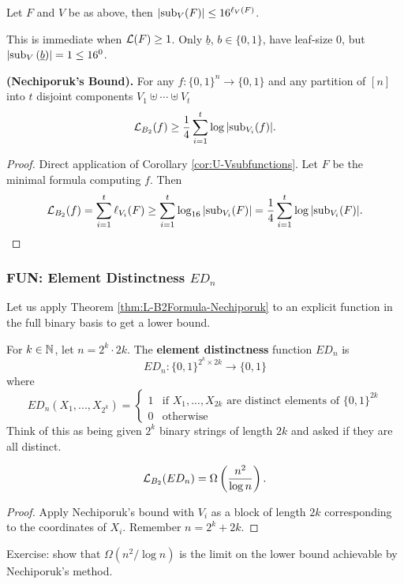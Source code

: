 \documentclass[11pt]{article}
\begin{document}
	\begin{corollary}
		\label{cor:U-Vsubfunctions}
		Let $F$ and $V$ be as above, then $|\mathrm{sub}_V(F)| \leq 16^{\ell_V(F)}$.
	\end{corollary}
	This is immediate when $\mathcal{L}(F) \geq 1$. Only $\underline{b}$, $b \in \{0,1\}$, have leaf-size $0$, but $\left|\mathrm{sub}_V\left(\underline{b}\right)\right| = 1 \leq 16^{0}$. 
	
	\begin{theorem}
		\label{thm:L-B2Formula-Nechiporuk}
		\textbf{(Nechiporuk's Bound).} For any $f: \{0,1\}^n \rightarrow \{0,1\}$ and any partition of $[n]$ into $t$ disjoint components $V_1 \uplus \cdots \uplus V_t$
		\[\mathcal{L}_{B_2}(f) \geq \frac{1}{4}\sum_{i = 1}^{t}\log|\mathrm{sub}_{V_i}(f)|.\]
	\end{theorem}
	\begin{proof}
		Direct application of Corollary \ref{cor:U-Vsubfunctions}. Let $F$ be the minimal formula computing $f$. Then
		\[\mathcal{L}_{B_2}(f) = \sum_{i = 1}^{t}\ell_{V_i}(F) \geq \sum_{i = 1}^{t}\log_{16}|\mathrm{sub}_{V_i}(F)| = \frac{1}{4} \sum_{i = 1}^{t}\log|\mathrm{sub}_{V_i}(F)|.\]
	\end{proof}
	
	\subsubsection{FUN: Element Distinctness \texorpdfstring{$ED_n$}{EDn}}
	Let us apply Theorem \ref{thm:L-B2Formula-Nechiporuk} to an explicit function in the full binary basis to get a lower bound.
	\begin{definition}
		\label{def:FUN-elementdistinctness}
		For $k \in \mathbb{N}$, let $n = 2^k \cdot 2k$. The \textbf{element distinctness} function $ED_n$ is
		\[ED_n: \{0,1\}^{2^k \times 2k} \rightarrow \{0,1\}\] where
		\[ED_n(X_1, ..., X_{2^k}) = \begin{cases}
		1 &\mbox{if $X_1, ..., X_{2k}$ are distinct elements of $\{0,1\}^{2k}$}\\
		0 &\mbox{otherwise}
		\end{cases}\]
		Think of this as being given $2^k$ binary strings of length $2k$ and asked if they are all distinct.
	\end{definition} 
	
	\begin{theorem}
		\label{thm:L-B2FormulaQuadraticExplicit}
		\[\mathcal{L}_{B_2}(ED_n) = \Omega\left(\frac{n^2}{\log n}\right).\]
	\end{theorem}
	\begin{proof}
		Apply Nechiporuk's bound with $V_i$ as a block of length $2k$ corresponding to the coordinates of $X_i$. Remember $n = 2^k + 2k$.  
	\end{proof}
	Exercise: show that $\Omega(n^2/\log n)$ is the limit on the lower bound achievable by Nechiporuk's method.
	
\end{document}
